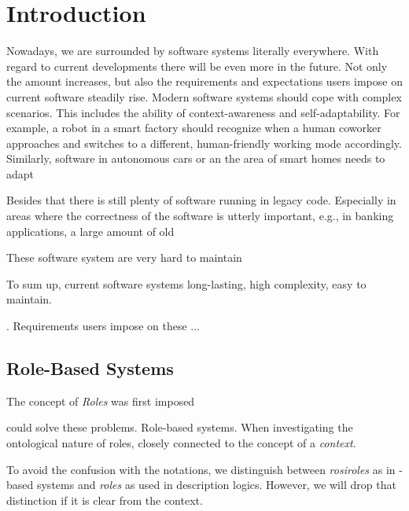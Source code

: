

\listoftodos

\chapter{Introduction}
\label{ch:introduction}

Nowadays, we are surrounded by software systems literally everywhere. With regard to current
developments there will be even more in the future. Not only the amount increases, but also the
requirements and expectations users impose on current software steadily rise. Modern software
systems should cope with complex scenarios. This includes the ability of context-awareness and
self-adaptability. For example, a robot in a smart factory should recognize when a human coworker
approaches and switches to a different, human-friendly working mode accordingly. Similarly, software
in autonomous cars or an the area of smart homes needs to adapt 


Besides that there is still plenty of software running in legacy code. Especially in areas
where the correctness of the software is utterly important, e.g., in banking applications, a large
amount of old 

These software system are very hard to maintain


To sum up, current software systems long-lasting, high complexity, easy to maintain.



. Requirements
users impose on these ... 




\section{Role-Based Systems}
\label{sec:intro-role-based-systems}

The concept of \emph{Roles} was first imposed


could solve these problems.  Role-based
systems. When investigating the ontological nature of roles, closely connected to the concept of a
\emph{context}.  

To avoid the confusion with the notations, we distinguish between \emph{rosiroles} as in
\rosirole-based systems
and \emph{roles} as used in description logics. However, we will drop that distinction if it is
clear from the context. 


